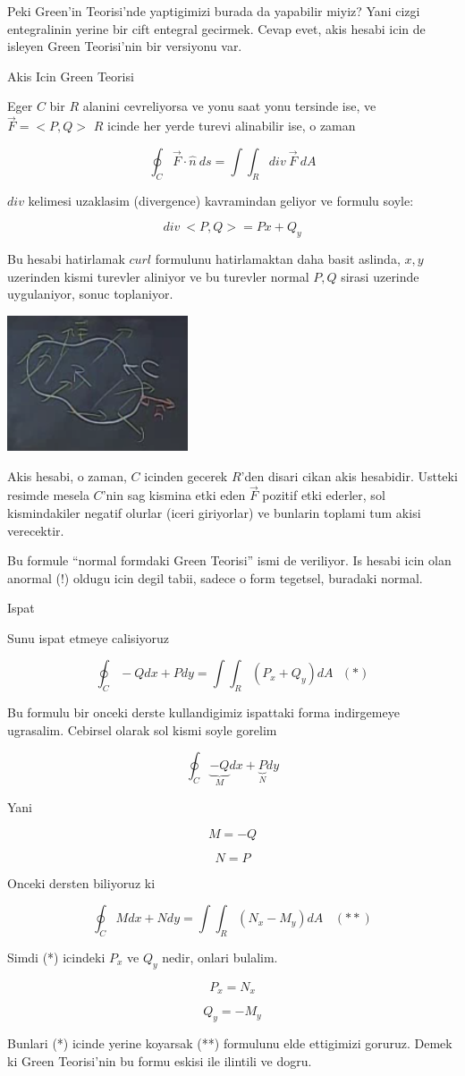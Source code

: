 \documentclass[12pt,fleqn]{article}
\begin{document}
Peki Green'in Teorisi'nde yaptigimizi burada da yapabilir miyiz? Yani cizgi
entegralinin yerine bir cift entegral gecirmek. Cevap evet, akis hesabi
icin de isleyen Green Teorisi'nin bir versiyonu var. 

Akis Icin Green Teorisi

Eger $C$ bir $R$ alanini cevreliyorsa ve yonu saat yonu tersinde ise, ve
$\vec{F}=<P,Q>$ $R$ icinde her yerde turevi alinabilir ise, o zaman 

\[ \oint_C \vec{F} \cdot \hat{n} \ ds = 
\int \int_R div \ \vec{F} \ dA
\]

$div$ kelimesi uzaklasim (divergence) kavramindan geliyor ve formulu soyle:

\[ div \ <P,Q> = Px + Q_y \]

Bu hesabi hatirlamak $curl$ formulunu hatirlamaktan daha basit aslinda,
$x,y$ uzerinden kismi turevler aliniyor ve bu turevler normal $P,Q$ sirasi
uzerinde uygulaniyor, sonuc toplaniyor. 

\includegraphics[height=4cm]{23_8.png}

Akis hesabi, o zaman, $C$ icinden gecerek $R$'den disari cikan akis
hesabidir. Ustteki resimde mesela $C$'nin sag kismina etki eden $\vec{F}$
pozitif etki ederler, sol kismindakiler negatif olurlar (iceri giriyorlar)
ve bunlarin toplami tum akisi verecektir. 

Bu formule ``normal formdaki Green Teorisi'' ismi de veriliyor. Is hesabi
icin olan anormal (!) oldugu icin degil tabii, sadece o form tegetsel,
buradaki normal. 

Ispat

Sunu ispat etmeye calisiyoruz

\[ \oint_C -Qdx + Pdy = \int \int_R (P_x + Q_y) dA 
\ \ \ (*)
\]

Bu formulu bir onceki derste kullandigimiz ispattaki forma indirgemeye
ugrasalim. Cebirsel olarak sol kismi soyle gorelim

\[ \oint_C 
\underbrace{-Q}_{M}dx + 
\underbrace{P}_{N}dy 
\]

Yani 

\[ M = -Q \]

\[ N = P \]

Onceki dersten biliyoruz ki 

\[ \oint_C Mdx + Ndy = \int \int_R (N_x - M_y) dA 
\ \ \ \ (**)
\]

Simdi (*) icindeki $P_x$ ve $Q_y$ nedir, onlari bulalim. 

\[ P_x = N_x \]

\[ Q_y = -M_y \]

Bunlari (*) icinde yerine koyarsak (**) formulunu elde ettigimizi
goruruz. Demek ki Green Teorisi'nin bu formu eskisi ile ilintili ve dogru. 
\end{document}
